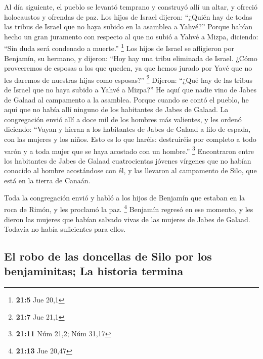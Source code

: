 \begin{paracol}{2}
 Al día siguiente, el pueblo se levantó temprano y
construyó allí un altar, y ofreció holocaustos y ofrendas de paz.
 Los hijos de Israel dijeron: ``¿Quién hay de todas las
tribus de Israel que no haya subido en la asamblea a Yahvé?'' Porque
habían hecho un gran juramento con respecto al que no subió a Yahvé a
Mizpa, diciendo: ``Sin duda será condenado a muerte.'' \footnote{\textbf{21:5}
  Jue 20,1}  Los hijos de Israel se afligieron por
Benjamín, su hermano, y dijeron: ``Hoy hay una tribu eliminada de
Israel.  ¿Cómo proveeremos de esposas a los que queden, ya
que hemos jurado por Yavé que no les daremos de nuestras hijas como
esposas?'' \footnote{\textbf{21:7} Jue 21,1}  Dijeron:
``¿Qué hay de las tribus de Israel que no haya subido a Yahvé a Mizpa?''
He aquí que nadie vino de Jabes de Galaad al campamento a la asamblea.
 Porque cuando se contó el pueblo, he aquí que no había
allí ninguno de los habitantes de Jabes de Galaad.  La
congregación envió allí a doce mil de los hombres más valientes, y les
ordenó diciendo: ``Vayan y hieran a los habitantes de Jabes de Galaad a
filo de espada, con las mujeres y los niños.  Esto es lo
que haréis: destruiréis por completo a todo varón y a toda mujer que se
haya acostado con un hombre.'' \footnote{\textbf{21:11} Núm 21,2; Núm
  31,17}  Encontraron entre los habitantes de Jabes de
Galaad cuatrocientas jóvenes vírgenes que no habían conocido al hombre
acostándose con él, y las llevaron al campamento de Silo, que está en la
tierra de Canaán.

 Toda la congregación envió y habló a los hijos de
Benjamín que estaban en la roca de Rimón, y les proclamó la paz.
\footnote{\textbf{21:13} Jue 20,47}  Benjamín regresó en
ese momento, y les dieron las mujeres que habían salvado vivas de las
mujeres de Jabes de Galaad. Todavía no había suficientes para ellos.

\hypertarget{el-robo-de-las-doncellas-de-silo-por-los-benjaminitas-la-historia-termina}{%
\subsection{El robo de las doncellas de Silo por los benjaminitas; La
historia
termina}\label{el-robo-de-las-doncellas-de-silo-por-los-benjaminitas-la-historia-termina}}


\end{paracol}
